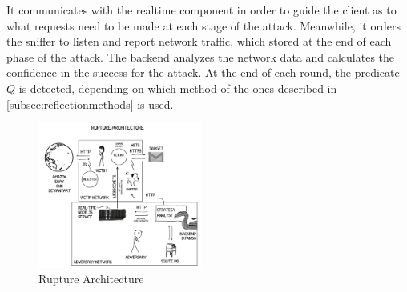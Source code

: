 It communicates with the realtime component in order to guide the client as to
what requests need to be made at each stage of the attack. Meanwhile, it orders
the sniffer to listen and report network traffic, which stored
at the end of each phase of the attack. The backend analyzes the
network data and calculates the confidence in the success for the attack. At the
end of each round, the predicate $Q$ is detected, depending on which method of
the ones described
in \ref{subsec:reflectionmethods} is used.

   \begin{figure}[thpb]
      \centering
          \includegraphics[width=0.48\textwidth]{figures/architecture.png}
      \caption{Rupture Architecture}
   \end{figure}
